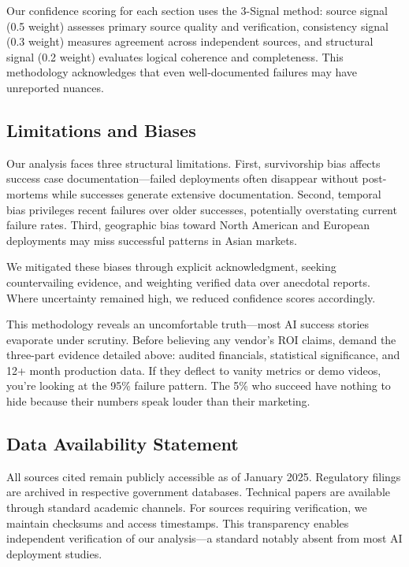 \documentclass[a4paper,11pt]{article}
\begin{document}
Our confidence scoring for each section uses the 3-Signal method: source signal (0.5 weight) assesses primary source quality and verification, consistency signal (0.3 weight) measures agreement across independent sources, and structural signal (0.2 weight) evaluates logical coherence and completeness. This methodology acknowledges that even well-documented failures may have unreported nuances.


\subsection{Limitations and Biases}

Our analysis faces three structural limitations. First, survivorship bias affects success case documentation—failed deployments often disappear without post-mortems while successes generate extensive documentation. Second, temporal bias privileges recent failures over older successes, potentially overstating current failure rates. Third, geographic bias toward North American and European deployments may miss successful patterns in Asian markets.


We mitigated these biases through explicit acknowledgment, seeking countervailing evidence, and weighting verified data over anecdotal reports. Where uncertainty remained high, we reduced confidence scores accordingly.


\begin{decisionbox}
This methodology reveals an uncomfortable truth—most AI success stories evaporate under scrutiny. Before believing any vendor's ROI claims, demand the three-part evidence detailed above: audited financials, statistical significance, and 12+ month production data. If they deflect to vanity metrics or demo videos, you're looking at the 95\% failure pattern. The 5\% who succeed have nothing to hide because their numbers speak louder than their marketing.
\end{decisionbox}


\subsection{Data Availability Statement}

All sources cited remain publicly accessible as of January 2025. Regulatory filings are archived in respective government databases. Technical papers are available through standard academic channels. For sources requiring verification, we maintain checksums and access timestamps. This transparency enables independent verification of our analysis—a standard notably absent from most AI deployment studies.
\end{document}
